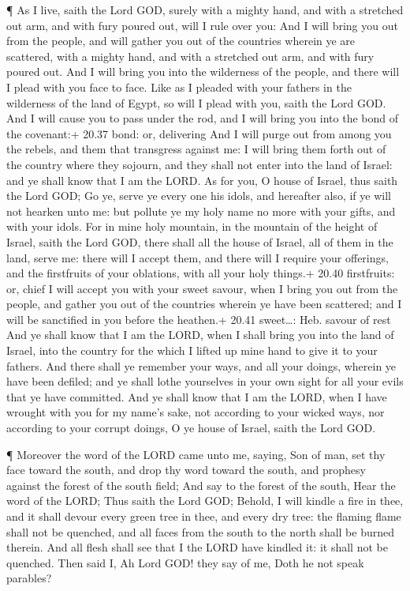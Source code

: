  ¶ As I live, saith the Lord GOD, surely with a mighty
hand, and with a stretched out arm, and with fury poured out, will I
rule over you:  And I will bring you out from the people,
and will gather you out of the countries wherein ye are scattered, with
a mighty hand, and with a stretched out arm, and with fury poured out.
 And I will bring you into the wilderness of the people,
and there will I plead with you face to face.  Like as I
pleaded with your fathers in the wilderness of the land of Egypt, so
will I plead with you, saith the Lord GOD.  And I will
cause you to pass under the rod, and I will bring you into the bond of
the covenant:+ 20.37 bond: or, delivering  And I will purge
out from among you the rebels, and them that transgress against me: I
will bring them forth out of the country where they sojourn, and they
shall not enter into the land of Israel: and ye shall know that I am the
LORD.  As for you, O house of Israel, thus saith the Lord
GOD; Go ye, serve ye every one his idols, and hereafter also, if ye will
not hearken unto me: but pollute ye my holy name no more with your
gifts, and with your idols.  For in mine holy mountain, in
the mountain of the height of Israel, saith the Lord GOD, there shall
all the house of Israel, all of them in the land, serve me: there will I
accept them, and there will I require your offerings, and the
firstfruits of your oblations, with all your holy things.+ 20.40
firstfruits: or, chief  I will accept you with your sweet
savour, when I bring you out from the people, and gather you out of the
countries wherein ye have been scattered; and I will be sanctified in
you before the heathen.+ 20.41 sweet\ldots: Heb. savour of rest
 And ye shall know that I am the LORD, when I shall bring
you into the land of Israel, into the country for the which I lifted up
mine hand to give it to your fathers.  And there shall ye
remember your ways, and all your doings, wherein ye have been defiled;
and ye shall lothe yourselves in your own sight for all your evils that
ye have committed.  And ye shall know that I am the LORD,
when I have wrought with you for my name's sake, not according to your
wicked ways, nor according to your corrupt doings, O ye house of Israel,
saith the Lord GOD.

 ¶ Moreover the word of the LORD came unto me, saying,
 Son of man, set thy face toward the south, and drop thy
word toward the south, and prophesy against the forest of the south
field;  And say to the forest of the south, Hear the word
of the LORD; Thus saith the Lord GOD; Behold, I will kindle a fire in
thee, and it shall devour every green tree in thee, and every dry tree:
the flaming flame shall not be quenched, and all faces from the south to
the north shall be burned therein.  And all flesh shall see
that I the LORD have kindled it: it shall not be quenched. 
Then said I, Ah Lord GOD! they say of me, Doth he not speak parables?

